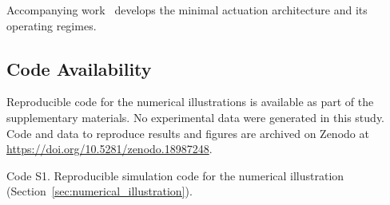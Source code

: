\documentclass{article}
\begin{document}
\noindent Accompanying work~\cite{andree2026thruster} develops the minimal actuation architecture and its operating regimes.

\subsection*{Code Availability}
Reproducible code for the numerical illustrations is available as part of the supplementary materials. No experimental data were generated in this study.
Code and data to reproduce results and figures are archived on Zenodo at \url{https://doi.org/10.5281/zenodo.18987248}.

Code S1. Reproducible simulation code for the numerical illustration (Section~\ref{sec:numerical_illustration}).

\printbibliography
\end{document}
